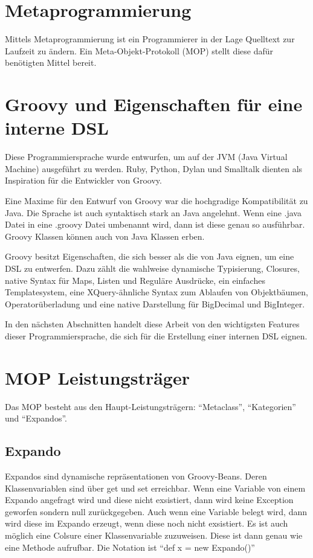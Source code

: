 \documentclass[11pt,english,ngerman, headsepline]{scrreprt}
\begin{document}
\section{Metaprogrammierung}\label{metaprogrammingLabel}

Mittels Metaprogrammierung ist ein Programmierer in der Lage Quelltext zur
Laufzeit zu ändern. Ein Meta-Objekt-Protokoll (MOP) stellt diese dafür
benötigten Mittel bereit.



\section{Groovy und Eigenschaften für eine interne DSL}

Diese Programmiersprache wurde entwurfen, um auf der JVM (Java Virtual Machine)
ausgeführt zu werden. Ruby, Python, Dylan und Smalltalk dienten als Inspiration
für die Entwickler von Groovy.

Eine Maxime für den Entwurf von Groovy war die hochgradige Kompatibilität zu
Java. Die Sprache ist auch syntaktisch stark an Java angelehnt. Wenn eine .java
Datei in eine .groovy Datei umbenannt wird, dann ist diese genau so ausführbar.
Groovy Klassen können auch von Java Klassen erben.

Groovy besitzt Eigenschaften, die sich besser als die von Java eignen, um eine
DSL zu entwerfen. Dazu zählt die wahlweise dynamische Typisierung, Closures,
native Syntax für Maps, Listen und Reguläre Ausdrücke, ein einfaches
Templatesystem, eine
XQuery-ähnliche Syntax zum Ablaufen von Objektbäumen, Operatorüberladung und
eine native Darstellung für BigDecimal und BigInteger.  

In den nächsten Abschnitten handelt diese Arbeit von den wichtigsten Features
dieser Programmiersprache, die sich für die Erstellung einer internen DSL
eignen. 


\section{MOP Leistungsträger}
Das MOP besteht aus den Haupt-Leistungsträgern: ``Metaclass'',
``Kategorien'' und ``Expandos''.

\subsection{Expando}\label{expando}

Expandos sind dynamische repräsentationen von Groovy-Beans. Deren
Klassenvariablen sind über get und set erreichbar. Wenn eine Variable von einem
Expando angefragt wird und diese nicht exsistiert, dann wird
keine Exception geworfen sondern null zurückgegeben. Auch wenn eine Variable
belegt wird, dann wird diese im Expando erzeugt, wenn diese noch nicht
exsistiert. Es ist auch möglich eine Colsure einer Klassenvariable zuzuweisen.
Diese ist dann genau wie eine Methode aufrufbar. Die Notation ist ``def x =
new Expando()''
\end{document}
